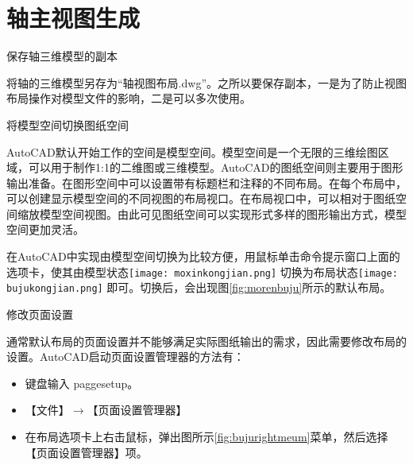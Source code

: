 \section{轴主视图生成}\label{sec:zhoushitu}
\begin{procedure}
\item 保存轴三维模型的副本

将轴的三维模型另存为“轴视图布局.dwg”。之所以要保存副本，一是为了防止视图布局操作对模型文件的影响，二是可以多次使用。


\item 将模型空间切换图纸空间

AutoCAD默认开始工作的空间是模型空间。模型空间是一个无限的三维绘图区域，可以用于制作1:1的二维图或三维模型。AutoCAD的图纸空间则主要用于图形输出准备。在图形空间中可以设置带有标题栏和注释的不同布局。在每个布局中，可以创建显示模型空间的不同视图的布局视口。在布局视口中，可以相对于图纸空间缩放模型空间视图。由此可见图纸空间可以实现形式多样的图形输出方式，模型空间更加灵活。

在AutoCAD中实现由模型空间切换为比较方便，用鼠标单击命令提示窗口上面的选项卡，使其由模型状态\texttt{[image: moxinkongjian.png]} 切换为布局状态\texttt{[image: bujukongjian.png]} 即可。切换后，会出现图\ref{fig:morenbuju}所示的默认布局。

\begin{figure}[htbp]
\centering
\begin{floatrow}[2]
\end{floatrow}
\end{figure}

\item 修改页面设置

通常默认布局的页面设置并不能够满足实际图纸输出的需求，因此需要修改布局的设置。AutoCAD启动页面设置管理器的方法有：
\begin{itemize}
\item 键盘输入 paggesetup。
\item 【文件】$\rightarrow$【页面设置管理器】
\item 在布局选项卡上右击鼠标，弹出图所示\ref{fig:bujurightmeum}菜单，然后选择【页面设置管理器】项。
\end{itemize}


\end{procedure}
